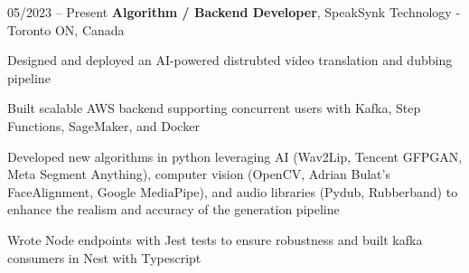 \begin{twocolentry}{
    05/2023 – Present
}
\fontsize{11 pt}{11 pt}\textbf{Algorithm / Backend Developer}, SpeakSynk Technology - Toronto ON, Canada\end{twocolentry}

\vspace{0.10 cm}
\begin{onecolentry}
    \begin{highlights}
        \item Designed and deployed an AI-powered distrubted video translation and dubbing pipeline
        \item Built scalable AWS backend supporting concurrent users with Kafka, Step Functions, SageMaker, and Docker
        \item Developed new algorithms in python leveraging AI (Wav2Lip, Tencent GFPGAN, Meta Segment Anything), computer vision (OpenCV, Adrian Bulat’s FaceAlignment, Google MediaPipe), and audio libraries (Pydub, Rubberband) to enhance the realism and accuracy of the generation pipeline 
        \item Wrote Node endpoints with Jest tests to ensure robustness and built kafka consumers in Nest with Typescript
    \end{highlights}
\end{onecolentry}
